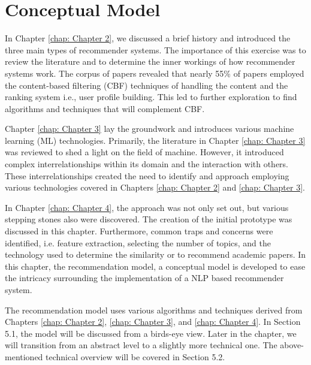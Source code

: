 \chapter{Conceptual Model}
\label{chap: Chapter 5}

In Chapter \ref{chap: Chapter 2}, we discussed a brief history and introduced the three main types of recommender systems. The importance of this exercise was to review the literature and to determine the inner workings of how recommender systems work. The corpus of papers revealed that nearly 55\% of papers employed the content-based filtering (CBF) techniques of handling the content and the ranking system i.e., user profile building. This led to further exploration to find algorithms and techniques that will complement CBF.

Chapter \ref{chap: Chapter 3} lay the groundwork and introduces various machine learning (ML) technologies. Primarily, the literature in Chapter \ref{chap: Chapter 3} was reviewed to shed a light on the field of machine. However, it introduced complex interrelationships within its domain and the interaction with others. These interrelationships created the need to identify and approach employing various technologies covered in Chapters \ref{chap: Chapter 2} and \ref{chap: Chapter 3}.

In Chapter \ref{chap: Chapter 4}, the approach was not only set out, but various stepping stones also were discovered. The creation of the initial prototype was discussed in this chapter. Furthermore, common traps and concerns were identified, i.e. feature extraction, selecting the number of topics, and the technology used to determine the similarity or to recommend academic papers.
In this chapter, the recommendation model, a conceptual model is developed to ease the intricacy surrounding the implementation of a NLP based recommender system. 

The recommendation model uses various algorithms and techniques derived from Chapters \ref{chap: Chapter 2}, \ref{chap: Chapter 3}, and \ref{chap: Chapter 4}. In Section 5.1, the model will be discussed from a birds-eye view. Later in the chapter, we will transition from an abstract level to a slightly more technical one. The above-mentioned technical overview will be covered in Section 5.2.

